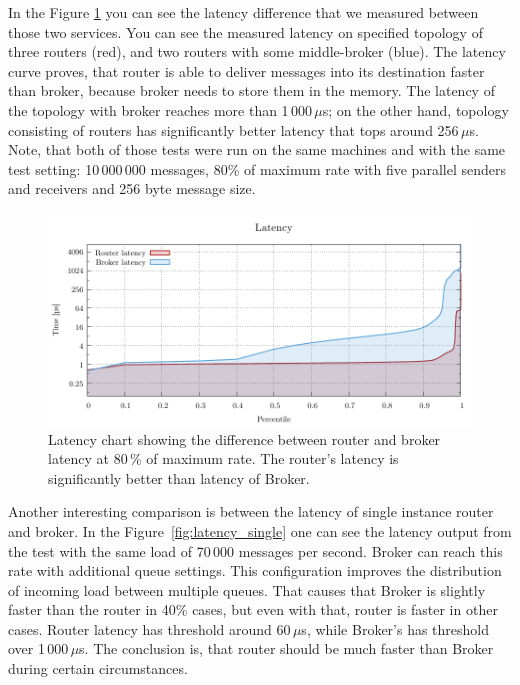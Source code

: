 In the Figure \ref{fig:latency} you can see the latency difference that we measured between those two services. You can see the measured latency on specified topology of three routers (red), and two routers with some middle-broker (blue). The latency curve proves, that router is able to deliver messages into its destination faster than broker, because broker needs to store them in the memory. The latency of the topology with broker reaches more than 1\,000\,$\mu$s; on the other hand, topology consisting of routers has significantly better latency that tops around 256\,$\mu$s. Note, that both of those tests were run on the same machines and with the same test setting: 10\,000\,000 messages, 80\% of maximum rate with five parallel senders and receivers and 256 byte message size.


\begin{figure}[h]
	\centering
	\includegraphics[width=1\linewidth]{obrazky-figures/charts-excel/latency.pdf}
	\caption{Latency chart showing the difference between router and broker latency at 80\,\% of maximum rate. The router's latency is significantly better than latency of Broker.}
	\label{fig:latency}
\end{figure}

Another interesting comparison is between the latency of single instance router and broker. In the Figure~\ref{fig:latency_single} one can see the latency output from the test with the same load of 70\,000 messages per second. Broker can reach this rate with additional queue settings. This configuration improves the distribution of incoming load between multiple queues. That causes that Broker is slightly faster than the router in 40\% cases, but even with that, router is faster in other cases. Router latency has threshold around 60\,$\mu$s, while Broker's has threshold over 1\,000\,$\mu$s. The conclusion is, that router should be much faster than Broker during certain circumstances.

